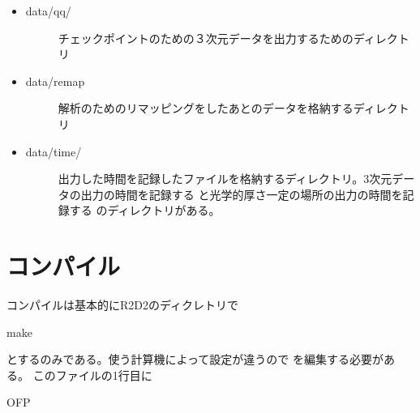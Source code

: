 \documentclass[letterpaper,10pt,dvipdfmx,report]{sphinxmanual}
\begin{document}
\begin{itemize}
\begin{description}
\begin{itemize}
\begin{description}
\end{description}

\item {} \begin{description}
\item[{data/qq/}] \leavevmode
チェックポイントのための３次元データを出力するためのディレクトリ

\end{description}

\item {} \begin{description}
\item[{data/remap}] \leavevmode
解析のためのリマッピングをしたあとのデータを格納するディレクトリ

\end{description}

\item {} \begin{description}
\item[{data/time/}] \leavevmode
出力した時間を記録したファイルを格納するディレクトリ。3次元データの出力の時間を記録する  と光学的厚さ一定の場所の出力の時間を記録する  のディレクトリがある。

\end{description}

\end{itemize}

\end{description}

\end{itemize}


\section{コンパイル}
\label{\detokenize{start:id2}}
コンパイルは基本的にR2D2のディクレトリで

\begin{sphinxVerbatim}[commandchars=\\\{\}]
make
\end{sphinxVerbatim}

とするのみである。使う計算機によって設定が違うので  を編集する必要がある。
このファイルの1行目に

\begin{sphinxVerbatim}[commandchars=\\\{\}]
OFP
\end{sphinxVerbatim}
\end{document}
